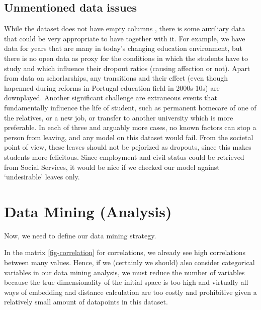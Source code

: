 \documentclass[
  letterpaper,
  DIV=11,
  numbers=noendperiod]{scrartcl}
\begin{document}
\hypertarget{unmentioned-data-issues}{%
\subsection{Unmentioned data issues}\label{unmentioned-data-issues}}

While the dataset does not have empty columns , there is some auxiliary
data that could be very appropriate to have together with it. For
example, we have data for years that are many in today's changing
education environment, but there is no open data as proxy for the
conditions in which the students have to study and which influence their
dropout ratios (causing affection or not). Apart from data on
schorlarships, any transitions and their effect (even though hapenned
during reforms in Portugal education field in 2000s-10s) are downplayed.
Another significant challenge are extraneous events that fundamentally
influence the life of student, such as permanent homecare of one of the
relatives, or a new job, or transfer to another university which is more
preferable. In each of three and arguably more cases, no known factors
can stop a person from leaving, and any model on this dataset would
fail. From the societal point of view, these leaves should not be
pejorized as dropouts, since this makes students more felicitous. Since
employment and civil status could be retrieved from Social Services, it
would be nice if we checked our model against \enquote*{undesirable}
leaves only.

\hypertarget{sec-data-mining}{%
\section{Data Mining (Analysis)}\label{sec-data-mining}}

Now, we need to define our data mining strategy.

In the matrix \ref{fig-correlation} for correlations, we already see
high correlations between many values. Hence, if we (certainly we
should) also consider categorical variables in our data mining analysis,
we must reduce the number of variables because the true dimensionality
of the initial space is too high and virtually all ways of embedding and
distance calculation are too costly and prohibitive given a relatively
small amount of datapoints in this dataset.
\end{document}
